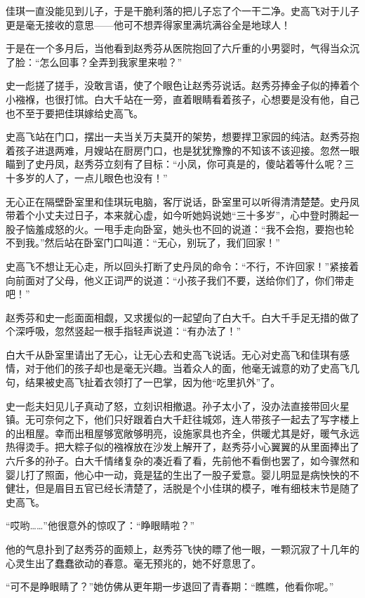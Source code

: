 佳琪一直没能见到儿子，于是干脆利落的把儿子忘了个一干二净。史高飞对于儿子更是毫无接收的意思——他可不想弄得家里满坑满谷全是地球人！

于是在一个多月后，当他看到赵秀芬从医院抱回了六斤重的小男婴时，气得当众沉了脸：``怎么回事？全弄到我家里来啦？''

史一彪搓了搓手，没敢言语，使了个眼色让赵秀芬说话。赵秀芬捧金子似的捧着个小襁褓，也很打怵。白大千站在一旁，直着眼睛看着孩子，心想要是没有他，自己也不至于要把佳琪嫁给史高飞。

史高飞站在门口，摆出一夫当关万夫莫开的架势，想要捍卫家园的纯洁。赵秀芬抱着孩子进退两难，月嫂站在厨房门口，也是犹犹豫豫的不知该不该迎接。忽然一眼瞄到了史丹凤，赵秀芬立刻有了目标：``小凤，你可真是的，傻站着等什么呢？三十多岁的人了，一点儿眼色也没有！''

无心正在隔壁卧室里和佳琪玩电脑，客厅说话，卧室里可以听得清清楚楚。史丹凤带着个小丈夫过日子，本来就心虚，如今听她妈说她``三十多岁''，心中登时腾起一股子恼羞成怒的火。一甩手走向卧室，她头也不回的说道：``我不会抱，要抱也轮不到我。''然后站在卧室门口叫道：``无心，别玩了，我们回家！''

史高飞不想让无心走，所以回头打断了史丹凤的命令：``不行，不许回家！''紧接着向前面对了父母，他义正词严的说道：``小孩子我们不要，送给你们了，你们带走吧！''

赵秀芬和史一彪面面相觑，又求援似的一起望向了白大千。白大千手足无措的做了个深呼吸，忽然竖起一根手指轻声说道：``有办法了！''

白大千从卧室里请出了无心，让无心去和史高飞说话。无心对史高飞和佳琪有感情，对于他们的孩子却也是毫无兴趣。当着众人的面，他毫无诚意的劝了史高飞几句，结果被史高飞扯着衣领打了一巴掌，因为他``吃里扒外''了。

史一彪夫妇见儿子真动了怒，立刻识相撤退。孙子太小了，没办法直接带回火星镇。无可奈何之下，他们只好跟着白大千赶往城郊，连人带孩子一起去了写字楼上的出租屋。幸而出租屋够宽敞够明亮，设施家具也齐全，供暖尤其是好，暖气永远热得烫手。把大粽子似的襁褓放在沙发上解开了，赵秀芬小心翼翼的从里面捧出了六斤多的孙子。白大千情绪复杂的凑近看了看，先前他不看倒也罢了，如今骤然和婴儿打了照面，他心中一动，竟是猛的生出了一股子爱意。婴儿明显是病怏怏的不健壮，但是眉目五官已经长清楚了，活脱是个小佳琪的模子，唯有细枝末节是随了史高飞。

``哎哟\ldots{}\ldots{}''他很意外的惊叹了：``睁眼睛啦？''

他的气息扑到了赵秀芬的面颊上，赵秀芬飞快的瞟了他一眼，一颗沉寂了十几年的心灵生出了蠢蠢欲动的春意。毫无预兆的，她不好意思了。

``可不是睁眼睛了？''她仿佛从更年期一步退回了青春期：``瞧瞧，他看你呢。''

